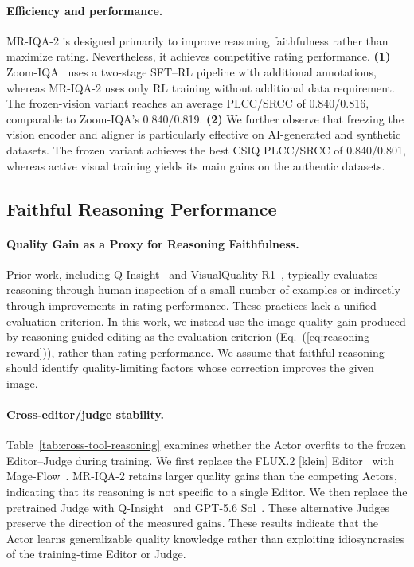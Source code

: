 \documentclass[letterpaper]{article} %
\begin{document}
\paragraph{Efficiency and performance.}
MR-IQA-2 is designed primarily to improve reasoning faithfulness rather than
maximize rating. Nevertheless, it achieves competitive rating
performance. \textbf{(1)} Zoom-IQA~\citep{zoom-iqa} uses a two-stage SFT--RL
pipeline with additional annotations, whereas MR-IQA-2 uses only RL training without additional data requirement. The frozen-vision variant
reaches an average PLCC/SRCC of 0.840/0.816, comparable to Zoom-IQA's
0.840/0.819. \textbf{(2)} We further observe that freezing the vision encoder
and aligner is particularly effective on AI-generated and synthetic datasets.
The frozen variant achieves the best CSIQ PLCC/SRCC of 0.840/0.801, whereas
active visual training yields its main gains on the authentic datasets.


\subsection{Faithful Reasoning Performance}
\label{sec:faithful-reasoning-performance}
\paragraph{Quality Gain as a Proxy for Reasoning Faithfulness.}
Prior work, including Q-Insight~\citep{q-insight} and
VisualQuality-R1~\citep{Visualquality-r1}, typically evaluates reasoning through human inspection of a small number of examples or indirectly through improvements in rating performance. These practices lack a unified evaluation criterion. In this work, we instead use the image-quality gain produced by reasoning-guided editing as the evaluation criterion (Eq.~(\ref{eq:reasoning-reward})), rather than rating performance. We assume that faithful reasoning should identify quality-limiting factors whose correction improves the given image.
\paragraph{Cross-editor/judge stability.}
Table~\ref{tab:cross-tool-reasoning} examines whether the Actor overfits to the
frozen Editor--Judge during training. We first replace the FLUX.2 [klein] Editor~\citep{flux2} with
Mage-Flow~\citep{zhang2026mageflow}. MR-IQA-2 retains larger quality gains than
the competing Actors, indicating that its reasoning is not specific to a single
Editor. We then replace the pretrained Judge with
Q-Insight~\citep{q-insight} and GPT-5.6 Sol~\citep{openai2026gpt56sol}. These
alternative Judges preserve the direction of the measured gains. These results indicate that the Actor learns
generalizable quality knowledge rather than exploiting idiosyncrasies of the
training-time Editor or Judge.
\end{document}
